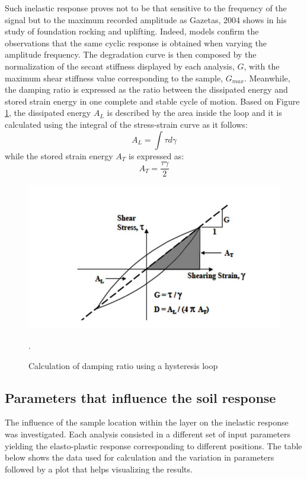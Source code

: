 \documentclass[12pt,a4paper]{report}
\begin{document}
Such inelastic response proves not to be that sensitive to the frequency of the signal but to the maximum recorded amplitude as Gazetas, 2004 \cite{gazetas2004seismic} shows in his study of foundation rocking and uplifting. Indeed, models confirm the observations that the same cyclic response is obtained when varying the amplitude frequency. 
The degradation curve is then composed by the normalization of the secant stiffness displayed by each analysis, $G$, with the maximum shear stiffness value corresponding to the sample, $G_{max}$. Meanwhile, the damping ratio is expressed as the ratio between the dissipated energy and stored strain energy in one complete and stable cycle of motion. Based on Figure \ref{loop}, the dissipated energy $A_L$ is described by the area inside the loop and it is calculated using the integral of the stress-strain curve as it follows:
\begin{equation}
	A_L=\int\tau d\gamma
\end{equation}
while the stored strain energy $A_T$ is expressed as:
\begin{equation}
	A_T=\frac{\tau \gamma}{2}
\end{equation}

\begin{figure}[h!]
	\centering
	\includegraphics[width=0.4\linewidth]{"loop"}
	\caption{Calculation of damping ratio using a hysteresis loop}
	\label{loop}.
\end{figure}

\newpage
\subsection{Parameters that influence the soil response}
The influence of the sample location within the layer on the inelastic response was investigated. Each analysis consisted in a different set of input parameters yielding the elasto-plastic response corresponding to different positions. The table below shows the data used for calculation and the variation in parameters followed by a plot that helps visualizing the results. 
\end{document}
